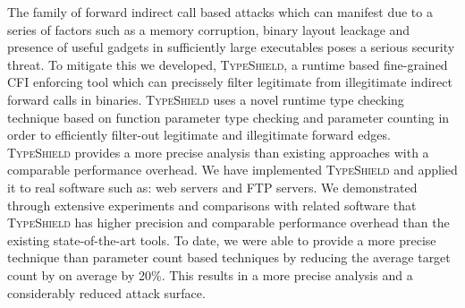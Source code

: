 The family of forward indirect call based attacks which can manifest due to a series of factors such as
a memory corruption, binary layout leackage and presence of useful
gadgets in sufficiently large executables poses a serious security threat.
To mitigate this we developed, \textsc{TypeShield}, a runtime based fine-grained CFI enforcing
tool which can precissely filter legitimate from illegitimate indirect forward calls in binaries.
\textsc{TypeShield} uses a novel runtime type checking technique based on function parameter
type checking and parameter counting in order to efficiently filter-out legitimate
and illegitimate forward edges.
\textsc{TypeShield} provides a more precise analysis than existing approaches with a
comparable performance overhead.
We have implemented \textsc{TypeShield} and applied it to real software such as:
web servers and FTP servers.
We demonstrated through extensive experiments and comparisons with related software
that \textsc{TypeShield} has higher precision and comparable performance overhead than 
the existing state-of-the-art tools. To date, we were able to provide a more precise
technique than parameter count based techniques by reducing the average target count by 
on average by 20\%. This results in a more precise analysis and a considerably reduced attack surface.


